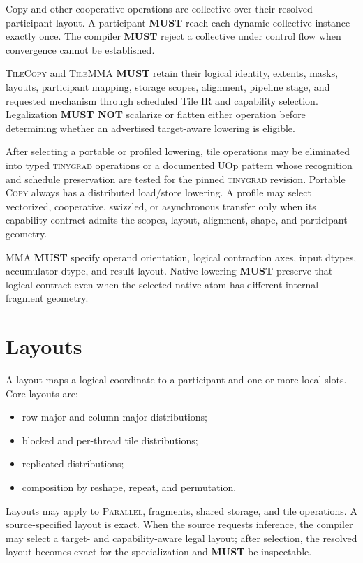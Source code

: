 \documentclass[10pt,letterpaper]{article}
\newcommand{\tinygrad}{\textsc{tinygrad}}
\newcommand{\op}[1]{\textsc{#1}}
\newcommand{\must}{\textbf{MUST}}
\newcommand{\mustnot}{\textbf{MUST NOT}}
\begin{document}
Copy and other cooperative operations are collective over their resolved
participant layout. A participant \must{} reach each dynamic collective instance
exactly once. The compiler \must{} reject a collective under control flow when
convergence cannot be established.

\op{TileCopy} and \op{TileMMA} \must{} retain their logical identity, extents,
masks, layouts, participant mapping, storage scopes, alignment, pipeline stage,
and requested mechanism through scheduled Tile IR and capability selection.
Legalization \mustnot{} scalarize or flatten either operation before determining
whether an advertised target-aware lowering is eligible.

After selecting a portable or profiled lowering, tile operations may be
eliminated into typed \tinygrad{} operations or a documented UOp pattern whose
recognition and schedule preservation are tested for the pinned \tinygrad{}
revision. Portable \op{Copy} always has a distributed load/store lowering. A
profile may select vectorized, cooperative, swizzled, or asynchronous transfer
only when its capability contract admits the scopes, layout, alignment, shape,
and participant geometry.

\op{MMA} \must{} specify operand orientation, logical contraction axes, input
dtypes, accumulator dtype, and result layout. Native lowering \must{} preserve
that logical contract even when the selected native atom has different internal
fragment geometry.

\section*{Layouts}

A layout maps a logical coordinate to a participant and one or more local
slots. Core layouts are:

\begin{itemize}
  \item row-major and column-major distributions;
  \item blocked and per-thread tile distributions;
  \item replicated distributions;
  \item composition by reshape, repeat, and permutation.
\end{itemize}

Layouts may apply to \op{Parallel}, fragments, shared storage, and tile
operations. A source-specified layout is exact. When the source requests
inference, the compiler may select a target- and capability-aware legal layout;
after selection, the resolved layout becomes exact for the specialization and
\must{} be inspectable.
\end{document}
